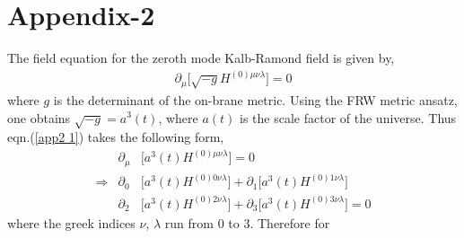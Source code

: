 \documentclass[a4paper]{article}
\begin{document}
\section*{Appendix-2}
The field equation for the zeroth mode Kalb-Ramond field is given by,
\begin{eqnarray}
 \partial_{\mu}\bigg[\sqrt{-g}H^{(0)\mu\nu\lambda}\bigg] = 0
 \label{app2 1}
\end{eqnarray}
where $g$ is the determinant of the on-brane metric. Using the FRW metric ansatz, one obtains $\sqrt{-g} = a^3(t)$, where $a(t)$ 
is the scale factor of the universe. Thus eqn.(\ref{app2 1}) takes the following form,
 \begin{eqnarray}
 &\partial_{\mu}&\bigg[a^3(t)H^{(0)\mu\nu\lambda}\bigg] = 0\nonumber\\
 \Rightarrow &\partial_{0}&\bigg[a^3(t)H^{(0)0\nu\lambda}\bigg] + \partial_{1}\bigg[a^3(t)H^{(0)1\nu\lambda}\bigg]\nonumber\\
 &\partial_{2}&\bigg[a^3(t)H^{(0)2\nu\lambda}\bigg] + \partial_{3}\bigg[a^3(t)H^{(0)3\nu\lambda}\bigg] = 0
 \label{app2 2}
\end{eqnarray}
where the greek indices $\nu$, $\lambda$ run from $0$ to $3$. Therefore for
\end{document}
